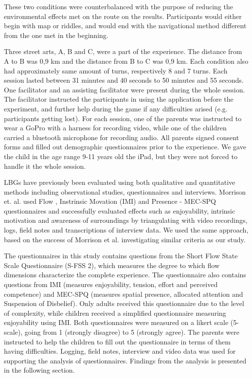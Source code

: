 These two conditions were counterbalanced with the purpose of reducing the environmental effects met on the route on the results. Participants would either begin with map or riddles, and would end with the navigational method different from the one met in the beginning. 

Three street arts, A, B and C, were a part of the experience. The distance from A to B was 0,9 km and the distance from B to C was 0,9 km. Each condition also had approximately same amount of turns, respectively 8 and 7 turns. Each session lasted between 31 minutes and 40 seconds to 50 minutes and 55 seconds. One facilitator and  an assisting facilitator were present during the whole session. The facilitator instructed the participants in using the application before the experiment, and further help during the game if any difficulties arised (e.g. participants getting lost). For each session, one of the parents was instructed to wear a GoPro with a harness for recording video, while one of the children carried a bluetooth microphone for recording audio. All parents signed consent forms and filled out demographic questionnaires prior to the experience. We gave the child in the age range 9-11 years old the iPad, but they were not forced to handle it the whole session. 

LBGs have previously been evaluated using both qualitative and quantitative methods including observational studies, questionnaires and interviews. Morrison et. al. used Flow \cite{GameFlow} , Instrinsic Movation (IMI) \cite{whatwhy} and Presence - MEC-SPQ \cite{Presence} questionnaires and successfully evaluated effects such as enjoyability, intrinsic motivation and awareness of surroundings by triangulating with video recordings, logs, field notes and transcriptions of interview data. We used the same approach, based on the success of Morrison et al. investigating similar criteria as our study. 

The questionnaires in this study contains questions from the Short Flow State Scale Questionnaire (S-FSS 2), which measures the degree to which flow dimensions characterize the
complete experience\cite{flowfss}. The questionnaire also contains questions from IMI (measures enjoyability, tension, effort and perceived competence) and MEC-SPQ (measures spatial presence, allocated attention and Suspension of Disbelief). Only adults received this questionnaire due to the level of complexity, while children received a simplified questionnaire measuring enjoyability using IMI. Both questionnaires were measured on a likert scale (5-scale), going from 1 (strongly disagree) to 5 (strongly agree). The parents were instructed to help the children to fill out the questionnaire in terms of them having difficulties. Logging, field notes, interview and video data was used for supporting the analysis of questionnaires. Findings from the analysis is presented in the following section. 
 
